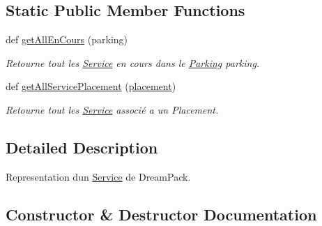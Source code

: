 \subsection*{Static Public Member Functions}
\begin{DoxyCompactItemize}
\item 
def \hyperlink{classsrc_1_1m_1_1_service_1_1_service_a6c396ab788a248ec1e9142c254014559}{get\+All\+En\+Cours} (parking)
\begin{DoxyCompactList}\small\item\em Retourne tout les \hyperlink{classsrc_1_1m_1_1_service_1_1_service}{Service} en cours dans le \hyperlink{namespacesrc_1_1m_1_1_parking}{Parking} parking. \end{DoxyCompactList}\item 
def \hyperlink{classsrc_1_1m_1_1_service_1_1_service_af02ad13e26cd6687aedc56fcae28eaa7}{get\+All\+Service\+Placement} (\hyperlink{classsrc_1_1m_1_1_service_1_1_service_a10358aecabfd87608fcfa4f7b112c3f8}{placement})
\begin{DoxyCompactList}\small\item\em Retourne tout les \hyperlink{classsrc_1_1m_1_1_service_1_1_service}{Service} associé a un Placement. \end{DoxyCompactList}\end{DoxyCompactItemize}


\subsection{Detailed Description}
Representation d\textquotesingle{}un \hyperlink{classsrc_1_1m_1_1_service_1_1_service}{Service} de Dream\+Pack. 

\subsection{Constructor \& Destructor Documentation}
\hypertarget{classsrc_1_1m_1_1_service_1_1_service_a537535762eeb41e482be3f5d52899b29}{}
